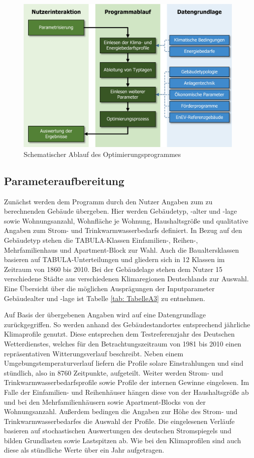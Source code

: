 \begin{figure}[H]
	\centering
		\includegraphics{Pictures/ProzessOptiProgramm.jpg}
	\caption{Schematischer Ablauf des Optimierungsprogrammes}
	\label{fig: Abbildung261} 
\end{figure}

\subsection{Parameteraufbereitung}
\label{subsec:Sektion261}

Zunächst werden dem Programm durch den Nutzer Angaben zum zu berechnenden Gebäude übergeben.
Hier werden Gebäudetyp, -alter und -lage sowie Wohnungsanzahl, Wohnfläche je Wohnung, Haushaltsgröße und qualitative Angaben zum Strom- und Trinkwarmwasserbedarfs definiert.
In Bezug auf den Gebäudetyp stehen die TABULA-Klassen Einfamilien-, Reihen-, Mehrfamilienhaus und Apartment-Block zur Wahl.
Auch die Baualtersklassen basieren auf TABULA-Unterteilungen und gliedern sich in 12 Klassen im Zeitraum von 1860 bis 2010.
Bei der Gebäudelage stehen dem Nutzer 15 verschiedene Städte aus verschiedenen Klimaregionen Deutschlands zur Auswahl.
Eine Übersicht über die möglichen Ausprägungen der Inputparameter Gebäudealter und -lage ist Tabelle \ref{tab: TabelleA3} zu entnehmen.

Auf Basis der übergebenen Angaben wird auf eine Datengrundlage zurückgegriffen.
So werden anhand des Gebäudestandortes entsprechend jährliche Klimaprofile genutzt.
Diese entsprechen dem Testreferenzjahr des Deutschen Wetterdienstes, welches für den Betrachtungszeitraum von 1981 bis 2010 einen repräsentativen Witterungsverlauf beschreibt.
Neben einem Umgebungstemperaturverlauf liefern die Profile solare Einstrahlungen und sind stündlich, also in 8760 Zeitpunkte, aufgeteilt.
Weiter werden Strom- und Trinkwarmwasserbedarfsprofile sowie Profile der internen Gewinne eingelesen.
Im Falle der Einfamilien- und Reihenhäuser hängen diese von der Haushaltsgröße ab und bei den Mehrfamilienhäusern sowie Apartment-Blocks von der Wohnungsanzahl.
Außerdem bedingen die Angaben zur Höhe des Strom- und Trinkwarmwasserbedarfes die Auswahl der Profile.
Die eingelesenen Verläufe basieren auf stochastischen Auswertungen des deutschen Stromspiegels und bilden Grundlasten sowie Lastspitzen ab.
Wie bei den Klimaprofilen sind auch diese als stündliche Werte über ein Jahr aufgetragen.

